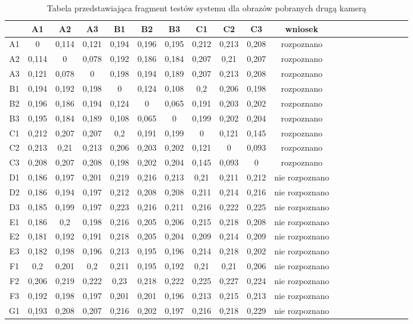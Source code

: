 \begin{table}
\begin{center}
\caption{Tabela przedstawiająca fragment testów systemu dla obrazów pobranych drugą kamerą}
\label{tab:druga1}
\begin{tabular}{|c|c|c|c|c|c|c|c|c|c|c|c|c|c|c|c|c|c|c|l|}
\hline
 & A1 & A2 & A3 & B1 & B2 & B3 & C1 & C2 & C3 & wniosek\\ \hline
A1 & 0&0,114&0,121&0,194&0,196&0,195&0,212&0,213&0,208 & rozpoznano\\ \hline
A2 & 0,114&0&0,078&0,192&0,186&0,184&0,207&0,21&0,207 & rozpoznano\\ \hline
A3 & 0,121&0,078&0&0,198&0,194&0,189&0,207&0,213&0,208 & rozpoznano\\ \hline
B1 & 0,194&0,192&0,198&0&0,124&0,108&0,2&0,206&0,198 & rozpoznano\\ \hline
B2 & 0,196&0,186&0,194&0,124&0&0,065&0,191&0,203&0,202 & rozpoznano\\ \hline
B3 & 0,195&0,184&0,189&0,108&0,065&0&0,199&0,202&0,204 & rozpoznano\\ \hline
C1 & 0,212&0,207&0,207&0,2&0,191&0,199&0&0,121&0,145 & rozpoznano\\ \hline
C2 & 0,213&0,21&0,213&0,206&0,203&0,202&0,121&0&0,093 & rozpoznano\\ \hline
C3 & 0,208&0,207&0,208&0,198&0,202&0,204&0,145&0,093&0 & rozpoznano\\ \hline
D1 & 0,186&0,197&0,201&0,219&0,216&0,213&0,21&0,211&0,212 & nie rozpoznano\\ \hline
D2 & 0,186&0,194&0,197&0,212&0,208&0,208&0,211&0,214&0,216 & nie rozpoznano\\ \hline
D3 & 0,185&0,199&0,197&0,223&0,216&0,211&0,216&0,222&0,225 & nie rozpoznano\\ \hline
E1 & 0,186&0,2&0,198&0,216&0,205&0,206&0,215&0,218&0,208 & nie rozpoznano\\ \hline
E2 & 0,181&0,192&0,191&0,218&0,205&0,204&0,209&0,214&0,209 & nie rozpoznano\\ \hline
E3 & 0,182&0,198&0,196&0,213&0,195&0,196&0,214&0,218&0,202 & nie rozpoznano\\ \hline
F1 & 0,2&0,201&0,2&0,211&0,195&0,192&0,21&0,21&0,206 & nie rozpoznano\\ \hline
F2 & 0,206&0,219&0,222&0,23&0,218&0,222&0,225&0,227&0,224 & nie rozpoznano\\ \hline
F3 & 0,192&0,198&0,197&0,201&0,201&0,196&0,213&0,215&0,213 & nie rozpoznano\\ \hline
G1 & 0,193&0,208&0,207&0,216&0,202&0,197&0,216&0,218&0,229 & nie rozpoznano\\ \hline

\end{tabular}
\end{center}
\end{table}
